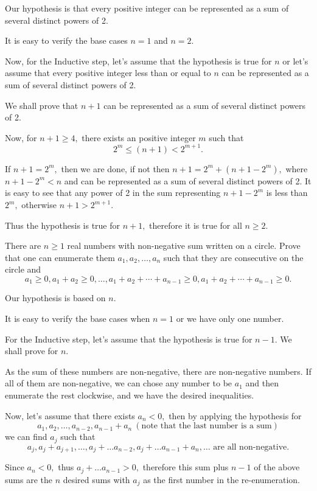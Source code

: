 \documentclass{article}
\begin{document}
\begin{soln}
    Our hypothesis is that every positive integer can be represented as a sum of several distinct powers of 2.

    It is easy to verify the base cases $n=1$ and $n=2.$ 
    
    Now, for the Inductive step, let's assume that the hypothesis is true for $n$ or let's assume that
    every positive integer less than or equal to $n$ can be represented as a sum of several distinct powers of 2.

    We shall prove that $n+1$ can be represented as a sum of several distinct powers of 2.

    Now, for $n+1 \ge 4,$ there exists an positive integer $m$ such that 
    \[
        2^m \le (n+1) < 2^{m+1}.
    \]
    
    If $n+1= 2^m,$ then we are done, if not then $n+1 = 2^m + (n+1-2^m),$
    where $n+1 - 2^m < n$ and can be represented as a sum of several distinct powers of 2.
    It is easy to see that any power of 2 in the sum representing $n+1-2^m$ is less than $2^m,$
    otherwise $n+1 > 2^{m+1}.$
    
    Thus the hypothesis is true for $n+1,$ therefore it is true for all $n \ge 2.$
\end{soln}

\begin{example}
    There are $n \ge 1$ real numbers with non-negative sum written on a circle.
    Prove that one can enumerate them $a_1, a_2, \ldots, a_n$ such that they are consecutive on the circle and
    \[
        a_1 \ge 0, a_1 + a_2 \ge 0, \ldots, a_1 + a_2 + \cdots + a_{n-1} \ge 0, a_1 + a_2 + \cdots + a_{n-1} \ge 0.
    \]
\end{example}

\begin{soln}
    Our hypothesis is based on $n$.

    It is easy to verify the base cases when $n=1$ or we have only one number.
    
    For the Inductive step, let's assume that the hypothesis is true for $n-1.$ We shall prove for $n.$

    As the sum of these numbers are non-negative, there are non-negative numbers.
    If all of them are non-negative, we can chose any number to be $a_1$ and then enumerate the rest clockwise,
    and we have the desired inequalities.
    
    Now, let's assume that there exists $a_n < 0,$ then by applying the hypothesis for 
    \[
        a_1, a_2, \ldots, a_{n-2}, a_{n-1} + a_n\ (\text{note that the last number is a sum})
    \]
    we can find $a_j$ such that
    \[
        a_j, a_j + a_{j+1}, \ldots, a_j + \ldots a_{n-2}, a_j + \ldots a_{n-1} + a_n, \ldots \text{\ are all non-negative.} 
    \]

    Since $a_n < 0,$ thus $ a_j + \ldots a_{n-1} > 0,$
    therefore this sum plus $n-1$ of the above sums are the $n$ desired sums with $a_j$ as the first number in the re-enumeration.
\end{soln}
\end{document}

